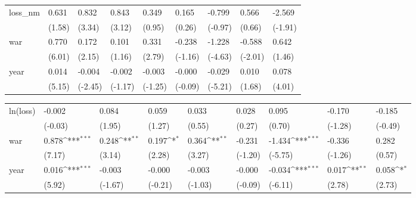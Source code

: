 \begin{tabular}{p{1.5cm} p{2cm} p{1.7cm} p{1.7cm} p{1.7cm} p{1.7cm} p{1.7cm} p{1.7cm} p{1.7cm}}
\hline
loss\_nm         &    0.631         &    0.832\sym{**} &    0.843\sym{**} &    0.349         &    0.165         &   -0.799         &    0.566         &   -2.569         \\
                &   (1.58)         &   (3.34)         &   (3.12)         &   (0.95)         &   (0.26)         &  (-0.97)         &   (0.66)         &  (-1.91)         \\
war             &    0.770\sym{***}&    0.172\sym{*}  &    0.101         &    0.331\sym{**} &   -0.238         &   -1.228\sym{***}&   -0.588\sym{*}  &    0.642         \\
                &   (6.01)         &   (2.15)         &   (1.16)         &   (2.79)         &  (-1.16)         &  (-4.63)         &  (-2.01)         &   (1.46)         \\
year            &    0.014\sym{***}&   -0.004\sym{*}  &   -0.002         &   -0.003         &   -0.000         &   -0.029\sym{***}&    0.010         &    0.078\sym{***}\\
                &   (5.15)         &  (-2.45)         &  (-1.17)         &  (-1.25)         &  (-0.09)         &  (-5.21)         &   (1.68)         &   (4.01)         \\
\end{tabular}
\def\sym#1{\ifmmode^{#1}\else\(^{#1}\)\fi}
\begin{tabular}{p{1.5cm} p{2cm} p{1.7cm} p{1.7cm} p{1.7cm} p{1.7cm} p{1.7cm} p{1.7cm} p{1.7cm}}
\hline
ln(loss)        &   -0.002         &    0.084         &    0.059         &    0.033         &    0.028         &    0.095         &   -0.170         &   -0.185         \\
                &  (-0.03)         &   (1.95)         &   (1.27)         &   (0.55)         &   (0.27)         &   (0.70)         &  (-1.28)         &  (-0.49)         \\
war             &    0.878\sym{***}&    0.248\sym{**} &    0.197\sym{*}  &    0.364\sym{**} &   -0.231         &   -1.434\sym{***}&   -0.336         &    0.282         \\
                &   (7.17)         &   (3.14)         &   (2.28)         &   (3.27)         &  (-1.20)         &  (-5.75)         &  (-1.26)         &   (0.57)         \\
year            &    0.016\sym{***}&   -0.003         &   -0.000         &   -0.003         &   -0.000         &   -0.034\sym{***}&    0.017\sym{**} &    0.058\sym{*}  \\
                &   (5.92)         &  (-1.67)         &  (-0.21)         &  (-1.03)         &  (-0.09)         &  (-6.11)         &   (2.78)         &   (2.73)         \\
\end{tabular}
